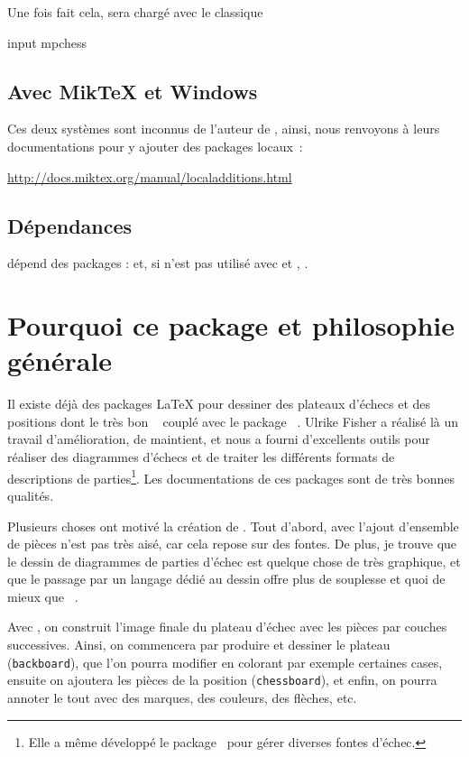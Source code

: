 \documentclass[french]{ltxdoc}
\begin{document}
Une fois fait cela, \mpchess sera chargé avec le classique
\begin{mpcode}
input mpchess
\end{mpcode}

\subsection{Avec Mik\TeX{} et Windows}

Ces deux systèmes sont inconnus de l’auteur de \mpchess, ainsi, nous renvoyons à
leurs documentations pour y ajouter des packages locaux :
\begin{center}
  \url{http://docs.miktex.org/manual/localadditions.html}
\end{center}



\subsection{Dépendances}

\mpchess dépend des packages \MP:  et, si
\mpchess n’est pas utilisé avec  et ,
.
\section{Pourquoi ce package et philosophie générale}

Il existe déjà des packages \LaTeX{} pour dessiner des plateaux d’échecs et des
positions dont le très bon ~\cite{ctan-xskak} couplé avec le
package ~\cite{ctan-chessboard}. Ulrike Fisher a réalisé là un
travail d’amélioration, de maintient, et nous a fourni d’excellents outils pour
réaliser des diagrammes d’échecs et de traiter les différents formats de
descriptions de parties\footnote{Elle a même développé le
package~ pour gérer diverses fontes d’échec.}. Les
documentations de ces packages sont de très bonnes qualités.

Plusieurs choses ont motivé la création de \mpchess. Tout d’abord, avec
 l’ajout d’ensemble de pièces n’est pas très aisé, car cela
repose sur des fontes. De plus, je trouve que le dessin de diagrammes de parties
d’échec est quelque chose de très graphique, et que le passage par un langage
dédié au dessin offre plus de souplesse et quoi de mieux que \MP~\cite{ctan-metapost}.


Avec \mpchess, on construit l’image finale du plateau d’échec avec les pièces
par couches successives. Ainsi, on commencera par produire et dessiner le
plateau (\lstinline+backboard+), que l’on pourra modifier en colorant par
exemple certaines cases, ensuite on ajoutera les pièces de la position
(\lstinline+chessboard+), et enfin, on pourra annoter le tout avec des marques, des couleurs, des flèches, etc.
\end{document}

